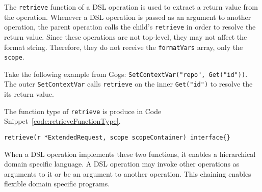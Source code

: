 
The \lstinline{retrieve} function of a DSL operation is used to extract a return value from the operation. Whenever a DSL operation is passed as an argument to another operation, the parent operation calls the child's \lstinline{retrieve} in order to resolve the return value. Since these operations are not top-level, they may not affect the format string. Therefore, they do not receive the \lstinline{formatVars} array, only the \lstinline{scope}.

Take the following example from Gogs: \lstinline{SetContextVar("repo", Get("id"))}. The outer \lstinline{SetContextVar} calls \lstinline{retrieve} on the inner \lstinline{Get("id")} to resolve the its return value.



The function type of \lstinline{retrieve} is produce in Code Snippet~\ref{code:retrieveFunctionType}.

\begin{lstlisting}[float=h,label=code:retrieveFunctionType,caption=The function type of the \lstinline{retrieve} function.]
retrieve(r *ExtendedRequest, scope scopeContainer) interface{}
\end{lstlisting}

When a DSL operation implements these two functions, it enables a hierarchical domain specific language. A DSL operation may invoke other operations as arguments to it or be an argument to another operation. This chaining enables flexible domain specific programs.


